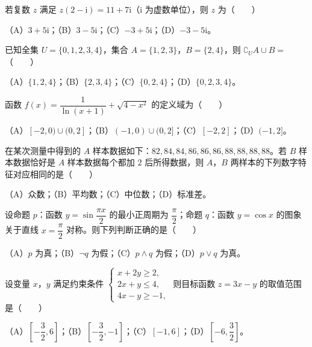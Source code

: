 

\begin{question}
若复数 $z$ 满足 $z(2-\mathrm i)=11+7\mathrm i$（$\mathrm i$ 为虚数单位），则 $z$ 为\mbox{（　　）}

（A）$3+5\mathrm i$；（B）$3-5\mathrm i$；（C）$-3+5\mathrm i$；（D）$-3-5\mathrm i$。

\end{question}
\begin{question}
已知全集 $U=\{0,1,2,3,4\}$，集合 $A=\{1,2,3\}$，$B=\{2,4\}$，则 $\complement_UA\cup B=$\mbox{（　　）}

（A）$\{1,2,4\}$；（B）$\{2,3,4\}$；（C）$\{0,2,4\}$；（D）$\{0,2,3,4\}$。

\end{question}
\begin{question}
函数 $f(x)=\dfrac1{\ln(x+1)}+\sqrt{4-x^2}$ 的定义域为\mbox{（　　）}

（A）$[-2,0)\cup(0,2]$；（B）$(-1,0)\cup(0,2]$；（C）$[-2,2]$；（D）$(-1,2]$。

\end{question}
\begin{question}
在某次测量中得到的 $A$ 样本数据如下：$82,84,84,86,86,86,88,88,88,88$。若 $B$ 样本数据恰好是 $A$ 样本数据每个都加 $2$ 后所得数据，则 $A$，$B$ 两样本的下列数字特征对应相同的是\mbox{（　　）}

（A）众数；（B）平均数；（C）中位数；（D）标准差。

\end{question}
\begin{question}
设命题 $p$：函数 $y=\sin\dfrac{\pi x}2$ 的最小正周期为 $\dfrac\pi2$；命题 $q$：函数 $y=\cos x$ 的图象关于直线 $x=\dfrac\pi2$ 对称。则下列判断正确的是\mbox{（　　）}

（A）$p$ 为真；（B）$\neg q$ 为假；（C）$p\wedge q$ 为假；（D）$p\vee q$ 为真。

\end{question}
\begin{question}
设变量 $x$，$y$ 满足约束条件 $\begin{cases}x+2y\geqslant2,\\2x+y\leqslant4,\\4x-y\geqslant-1,\end{cases}$ 则目标函数 $z=3x-y$ 的取值范围是\mbox{（　　）}

（A）$\left[-\dfrac32,6\right]$；（B）$\left[-\dfrac32,-1\right]$；（C）$[-1,6]$；（D）$\left[-6,\dfrac32\right]$。

\Needspace{0.4\textheight}
\end{question}
